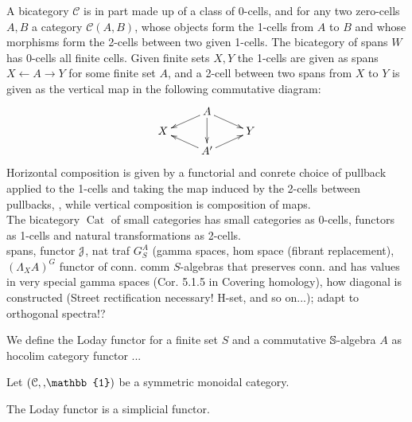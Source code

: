   A bicategory $\mathcal{C}$ is in part made up of a class of 0-cells, and for any two zero-cells $A,B$ a category $\mathcal{C}(A,B)$, whose objects form the 1-cells from $A$ to $B$ and whose morphisms form the 2-cells between two given 1-cells. The bicategory of spans $W$ has 0-cells all finite cells. Given finite sets $X,Y$ the 1-cells are given as spans $ X \leftarrow A \rightarrow Y$ for some finite set $A$, and a 2-cell between two spans from $X$ to $Y$  is given as the vertical map in the following commutative diagram:
  \[
  \xymatrix@R-=.5em{
    &
    A \ar[dl] \ar[dd] \ar[dr]
    \\
    X
    &
    &
    Y
    \\
    &
    A^\prime \ar[ul] \ar[ur]
    &
  }
  \]
  Horizontal composition is given by a functorial and conrete choice of pullback applied to the 1-cells and taking the map induced by the 2-cells between pullbacks, , while vertical composition is composition of maps.\\
  The bicategory $\operatorname{Cat}$ of small categories has small categories as 0-cells, functors as 1-cells and natural transformations as 2-cells.
  \\
  spans, functor $\mathcal{J}$, nat traf $G^A_S$ (gamma spaces, hom space (fibrant replacement), $(\Lambda_X A)^G$ functor of conn. comm $S$-algebras that preserves conn. and has values in very special gamma spaces (Cor. 5.1.5 in Covering homology), how diagonal is constructed (Street rectification necessary! H-set, and so on...); adapt to orthogonal spectra!?
  \begin{defn}\label{def_loday_functor}
    We define the Loday functor for a finite set $S$ and a commutative $\mathbb{S}$-algebra $A$ as hocolim category functor ...

  \end{defn}

  \begin{defn}\label{def_loday_functor_in_symmetric_monoidal_category}
    Let $(\mathcal{C},\smash, \mathbb{1})$ be a symmetric monoidal category.\\
  \end{defn}

  \begin{lem}\label{lem_loday_functor_is_simplicial}
    The Loday functor is a simplicial functor.\\
  \end{lem}
